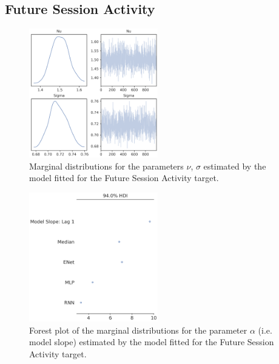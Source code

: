 \subsection{Future Session Activity}
\label{future_acti_bayes_2}

\begin{figure}[ht]
\centering
\includegraphics[width=0.5\textwidth]{images/appendix_C/Future Session Activity_marginals_2.png}
\caption[\textbf{Future session activity marginal distributions}]{Marginal distributions for the parameters $\nu$, $\sigma$ estimated by the model fitted for the Future Session Activity target.}
\label{marginals_acti_2}
\end{figure}
\FloatBarrier

\begin{figure}[ht]
\centering
\includegraphics[width=0.5\textwidth]{images/appendix_C/Future Session Activity_models_2.png}
\caption[\textbf{Future session activity model fixed effect}]{Forest plot of the marginal distributions for the parameter $\alpha$ (i.e. model slope) estimated by the model fitted for the Future Session Activity target.}
\label{model_acti_2}
\end{figure}
\FloatBarrier

